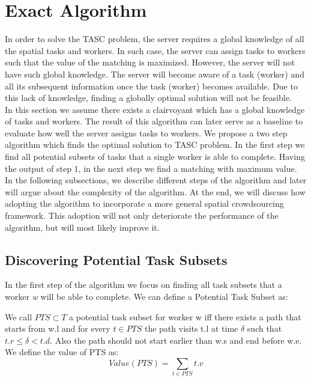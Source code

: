 \section{Exact Algorithm}
\label{sec:exactalgo}

In order to solve the TASC problem, the server requires a global knowledge of all the spatial tasks and workers. In such case, the server can assign tasks to workers such that the value of the matching is maximized. However, the server will not have such global knowledge. The server will become aware of a task (worker) and all its subsequent information once the task (worker) becomes available. Due to this lack of knowledge, finding a globally optimal solution will not be feasible.\\

In this section we assume there exists a clairvoyant which has a global knowledge of tasks and workers. The result of this algorithm can later serve as a baseline to evaluate how well the server assigns tasks to workers. We propose a two step algorithm which finds the optimal solution to TASC problem. In the first step we find all potential subsets of tasks that a single worker is able to complete. Having the output of step 1, in the next step we find a matching with maximum value. In the following subsections, we describe different steps of the algorithm and later will argue about the complexity of the algorithm. At the end, we will discuss how adopting the algorithm to incorporate a more general spatial crowdsourcing framework. This adoption will not only deteriorate the performance of the algorithm, but will most likely improve it.

\subsection{Discovering Potential Task Subsets}
\label{subsec:FindPTS}
In the first step of the algorithm we focus on finding all task subsets that a worker \emph{w} will be able to complete. We can define a Potential Task Subset as:

\begin{definition} 
\label{def:PTS}
We call $PTS \subset T$ a potential task subset for worker w iff there exists a path that starts from w.l and for every $t \in PTS$ the path visits t.l at time $\delta$ such that $t.r \leq \delta < t.d$. Also the path should not start earlier than w.s and end before w.e. We define the value of PTS as:
\begin{equation*}
Value(PTS) = \sum_{t \in PTS} t.v
\end{equation*}
\end{definition}

